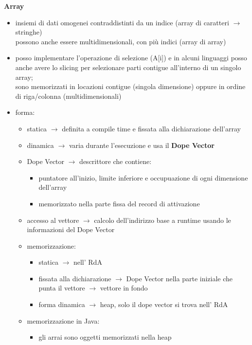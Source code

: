 \documentclass{article}
\begin{document}
\begin{flushleft}
\textbf{Array}
\begin{itemize}
  \item insiemi di dati omogenei contraddistinti da un indice (array di caratteri $\rightarrow$ stringhe) \\
        possono anche essere multidimensionali, con più indici (array di array)
  \item posso implementare l'operazione di selezione (A[i]) e in alcuni linguaggi 
        posso anche avere lo slicing per selezionare parti contigue all'interno di un singolo array; \\
        sono memorizzati in locazioni contigue (singola dimensione) oppure in ordine di riga/colonna (multidimensionali)
  \item forma: 
        \begin{itemize}
          \item statica  $\rightarrow$ definita a compile time e fissata alla dichiarazione dell'array
          \item dinamica  $\rightarrow$ varia durante l'esecuzione e usa il \textbf{Dope Vector}
          \item Dope Vector  $\rightarrow$ descrittore che contiene: 
          \begin{itemize}
            \item puntatore all'inizio, limite inferiore e occupuazione di ogni dimensione dell'array
            \item memorizzato nella parte fissa del record di attivazione 
          \end{itemize}
          \item accesso al vettore  $\rightarrow$ calcolo dell'indirizzo base a runtime usando le informazioni del Dope Vector
          \item memorizzazione: 
          \begin{itemize}
            \item statica $\rightarrow$ nell' RdA
            \item fissata alla dichiarazione $\rightarrow$ Dope Vector nella parte iniziale che punta il vettore $\rightarrow$ vettore in fondo
            \item forma dinamica $\rightarrow$ heap, solo il dope vector si trova nell' RdA
          \end{itemize}
          \item memorizzazione in Java:
          \begin{itemize}
            \item gli arrai sono oggetti memorizzati nella heap

\end{itemize}
\end{itemize}
\end{itemize}
\end{flushleft}
\end{document}
